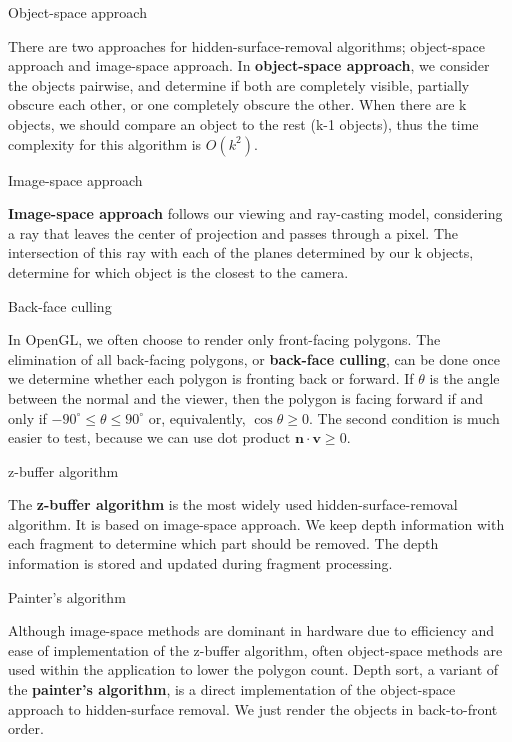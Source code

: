 \documentclass[10pt,a4paper]{article}
\begin{document}
\begin{enumerate}
		{\large \item Object-space approach}
				
			 There are two approaches for hidden-surface-removal algorithms; object-space approach and image-space approach.
			 In \textbf{object-space approach}, we consider the objects pairwise, and determine if both are completely visible, partially obscure each other, or one completely obscure the other. When there are k objects, we should compare an object to the rest (k-1 objects), thus the time complexity for this algorithm is $ O(k^2) $.\\
			 
		{\large \item Image-space approach}
				
			 \textbf{Image-space approach} follows our viewing and ray-casting model, considering a ray that leaves the center of projection and passes through a pixel. The intersection of this ray with each of the planes determined by our k objects, determine for which object is the closest to the camera.\\
			 
		{\large \item Back-face culling}
				
			In OpenGL, we often choose to render only front-facing polygons. The elimination of all back-facing polygons, or \textbf{back-face culling}, can be done once we determine whether each polygon is fronting back or forward. If $ \theta $ is the angle between the normal and the viewer, then the polygon is facing forward if and only if $ -90^\circ \le \theta \le 90^\circ $ or, equivalently, $ \cos{\theta} \ge 0 $. The second condition is much easier to test, because we can use dot product $ \textbf{n} \cdot \textbf{v} \ge 0 $.\\
			
		{\large \item z-buffer algorithm}
				
			The \textbf{z-buffer algorithm} is the most widely used hidden-surface-removal algorithm. It is based on image-space approach. We keep depth information with each fragment to determine which part should be removed. The depth information is stored and updated during fragment processing.\\
			
		{\large \item Painter’s algorithm}
			
			Although image-space methods are dominant in hardware due to efficiency and ease of implementation of the z-buffer algorithm, often object-space methods are used within the application to lower the polygon count. Depth sort, a variant of the \textbf{painter’s algorithm}, is a direct implementation of the object-space approach to hidden-surface removal. We just render the objects in back-to-front order.\\
		

\end{enumerate}
\end{document}
